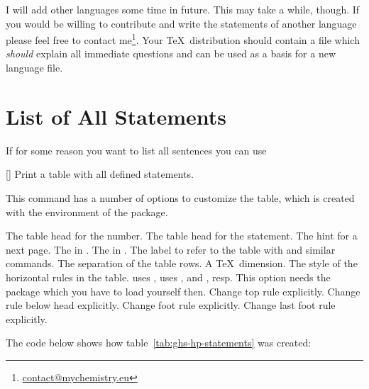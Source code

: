 \documentclass{ghsystem-manual}
\begin{document}

I will add other languages some time in future.  This may take a while,
though.  If you would be willing to contribute and write the statements of
another language please feel free to contact
me\footnote{\href{mailto:contact@mychemistry.eu}{contact@mychemistry.eu}}.
Your \TeX\ distribution should contain a file
 which \emph{should} explain all immediate
questions and can be used as a basis for a new language file.

\section{List of All Statements}
If for some reason you want to list all sentences you can use
\begin{commands}
  []
    Print a table with all defined statements.
\end{commands}

This command has a number of options to customize the table, which is created
with the  environment of the  package.
\begin{options}
    The table head for the number.
    The table head for the statement.
    The hint for a next page.
    The  in .
  \Default
    The  in .
    The label to refer to the table with  and similar commands.
  \Default{3pt}
    The separation of the table rows. A \TeX\ dimension.
    The style of the horizontal rules in the table.   uses
    ,  uses ,  and
    , resp.  This option needs the  package
    which you have to load yourself then.
    Change top rule explicitly.
    Change rule below head explicitly.
    Change foot rule explicitly.
    Change last foot rule explicitly.
\end{options}

The code below shows how table~\ref{tab:ghs-hp-statements} was created:
\begin{sourcecode}
  \ghslistall[fill-in,table-rules=booktabs]
\end{sourcecode}

\ghslistall[fill-in,table-rules=booktabs]

\printbibliography
\end{document}
